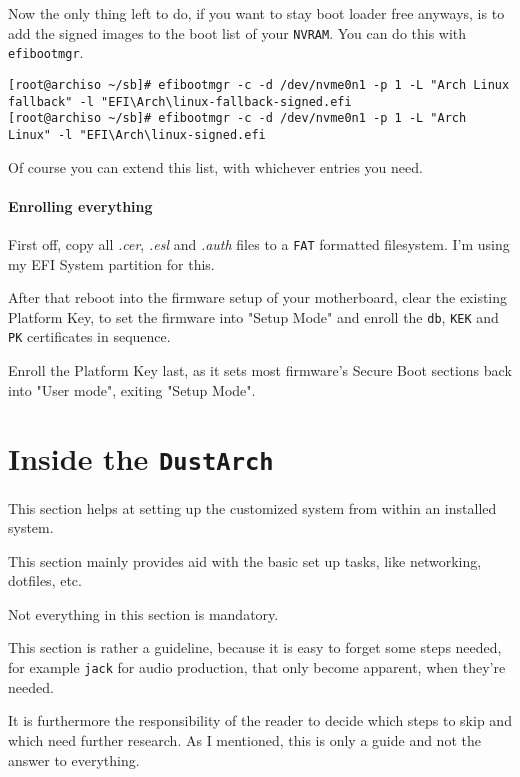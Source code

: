 \documentclass[10pt]{dustdoc}
\begin{document}
Now the only thing left to do, if you want to stay boot loader free anyways, is to add the signed images to the boot list of your \texttt{NVRAM}.
You can do this with \texttt{efibootmgr}.

\begin{verbatim}
[root@archiso ~/sb]# efibootmgr -c -d /dev/nvme0n1 -p 1 -L "Arch Linux fallback" -l "EFI\Arch\linux-fallback-signed.efi
[root@archiso ~/sb]# efibootmgr -c -d /dev/nvme0n1 -p 1 -L "Arch Linux" -l "EFI\Arch\linux-signed.efi
\end{verbatim}

Of course you can extend this list, with whichever entries you need.

\subsubsection{Enrolling everything}
\label{sec:enrolling-everything}

First off, copy all \textit{.cer}, \textit{.esl} and \textit{.auth} files to a \texttt{FAT} formatted filesystem.
I’m using my EFI System partition for this.

After that reboot into the firmware setup of your motherboard, clear the existing Platform Key, to set the firmware into "Setup Mode" and enroll the \texttt{db}, \texttt{KEK} and \texttt{PK} certificates in sequence.

\begin{NOTE}
    Enroll the Platform Key last, as it sets most firmware’s Secure Boot sections back into "User mode", exiting "Setup Mode".
\end{NOTE}

\chapter{Inside the \texttt{DustArch}}
\label{sec:inside-the-dustarch}

This section helps at setting up the customized system from within an installed system.

This section mainly provides aid with the basic set up tasks, like networking, dotfiles, etc.

\begin{NOTE}
    Not everything in this section is mandatory.

    This section is rather a guideline, because it is easy to forget some steps needed, for example \texttt{jack} for audio production, that only become apparent, when they’re needed.

    It is furthermore the responsibility of the reader to decide which steps to skip and which need further research.
    As I mentioned, this is only a guide and not the answer to everything.
\end{NOTE}
\end{document}
